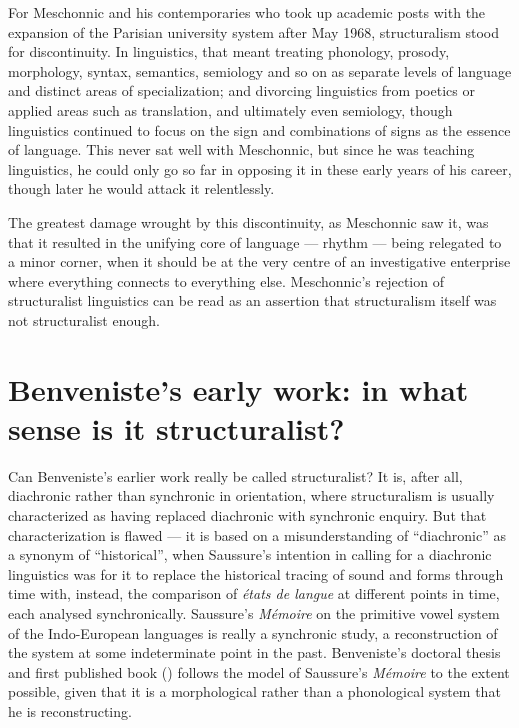 \documentclass[output=paper]{langscibook}
\begin{document}
For Meschonnic and his contemporaries who took up academic posts with the expansion of the Parisian university system after May 1968, structuralism stood for discontinuity. In linguistics, that meant treating phonology, prosody, morphology, syntax, semantics, semiology and so on as separate levels of language and distinct areas of specialization; and divorcing linguistics from poetics or applied areas such as translation, and ultimately even semiology, though linguistics continued to focus on the sign and combinations of signs as the essence of language. This never sat well with Meschonnic, but since he was teaching linguistics, he could only go so far in opposing it in these early years of his career, though later he would attack it relentlessly.

The greatest damage wrought by this discontinuity, as Meschonnic saw it, was that it resulted in the unifying core of language — rhythm — being relegated to a minor corner, when it should be at the very centre of an investigative enterprise where everything connects to everything else. Meschonnic's rejection of structuralist linguistics can be read as an assertion that structuralism itself was not structuralist enough.

\section{Benveniste’s early work: in what sense is it structuralist?}
\label{sec:joseph:earlywork}

Can Benveniste's earlier work really be called structuralist? It is, after all, diachronic rather than synchronic in orientation, where structuralism is usually characterized as having replaced diachronic with synchronic enquiry. But that characterization is flawed — it is based on a misunderstanding of ``diachronic'' as a synonym of ``historical'', when Saussure's intention in calling for a diachronic linguistics was for it to replace the historical tracing of sound and forms through time with, instead, the comparison of \emph{états de langue} at different points in time, each analysed synchronically. Saussure's \citeyear{Saussure1879} \emph{Mémoire} on the primitive vowel system of the Indo-European languages is really a synchronic study, a reconstruction of the system at some indeterminate point in the past. Benveniste's doctoral thesis and first published book (\citeyear{Benveniste1935}) follows the model of Saussure's \emph{Mémoire} to the extent possible, given that it is a morphological rather than a phonological system that he is reconstructing. 
\end{document}
